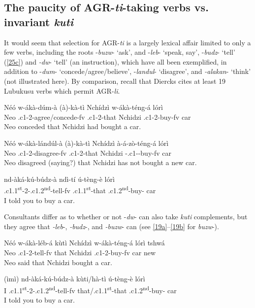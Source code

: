 \documentclass[output=paper,
modfonts
]{langscibook}
\begin{document}
\subsection{The paucity of AGR-\textit{ti}-taking verbs vs. invariant \textit{kuti}}

It would seem that selection for AGR-\textit{ti} is a largely lexical affair limited to only a few verbs, including the roots -\textit{buzw}- `ask', and -\textit{leb}- `speak, say', -\textit{budz}- `tell' (\ref{25c})  and \textit{-dw}- `tell' (an instruction), which have all been exemplified, in addition to -\textit{dum}- `concede/agree/believe', -\textit{landul}- `disagree', and  \textit{-alakan}- `think' (not illustrated here). By comparison, recall that Diercks cites at least 19 Lubukusu verbs which permit AGR-\textit{li}.

\ea
\ea \gll Néó  w-ákà-dúm-à (à)-kà-tì Nchídzì  w-ákà-téng-á lórì\\
	Neo .c1-2-agree/concede-fv .c1-2-that Nchidzi
    .c1-2-buy-fv car\\
	\glt Neo conceded that Nchidzi had bought a car.

\ex \gll Néó w-ákà-lándúl-à (à)-kà-tì Nchídzì à-á-zò-téng-á lórì \\
	Neo .c1-2-disagree-fv .c1-2-that Nchidzi -.c1--buy-fv car \\
	\glt Neo disagreed (saying?) that Nchidzi has not bought a new car.

\ex \label{25c} \gll nd-àká-kú-búdz-à ndì-tí ú-tèng-è lórì\\
	.c1.1\textsuperscript{st}-2-.c1.2\textsuperscript{nd}-tell-fv .c1.1\textsuperscript{st}-that
    .c1.2\textsuperscript{nd}-buy- car\\
	\glt I told you to buy a car. \z\z

Consultants differ as to whether or not -\textit{dw}- can also take \textit{kuti} complements, but they agree that \textit{-leb}-, \textit{-budz}-, and \textit{-buzw}- can (see \ref{19a}--\ref{19b} for \textit{buzw}-).

\ea
\ea \gll Néó w-ákà-léb-á kùtì  Nchídzì w-ákà-téng-á lórì tshwá\\
	Neo	.c1-2-tell-fv that Nchidzi .c1-2-buy-fv car new\\
	\glt Neo said that Nchidzi bought a car.

\ex \gll (ìmì) nd-àká-kú-búdz-à kùti/hà-tì ú-tèng-è lórì\\
      I .c1.1\textsuperscript{st}-2-.c1.2\textsuperscript{nd}-tell-fv that/.c1.1\textsuperscript{st}-that .c1.2\textsuperscript{nd}-buy- car\\
	\glt I told you to buy a car. \z\z
\end{document}

